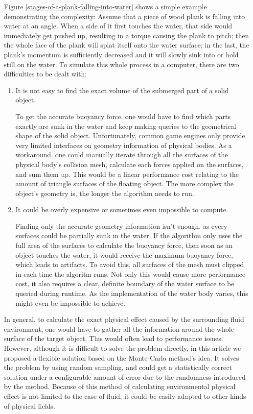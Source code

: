 Figure \ref{stages-of-a-plank-falling-into-water} shows a simple example demonstrating the complexity:
Assume that a piece of wood plank is falling into water at an angle.
When a side of it first touches the water, that side would immediately get pushed up, resulting in a torque causing the plank to pitch;
then the whole face of the plank will splat itself onto the water surface;
in the last, the plank's momentum is sufficiently decreased and it will slowly sink into or hold still on the water.
To simulate this whole process in a computer, there are two difficulties to be dealt with:

\begin{enumerate}
	\item It is not easy to find the exact volume of the submerged part of a solid object.

		To get the accurate buoyancy force, one would have to find which parts exactly are sunk in the water and keep making queries to the geometrical shape of the solid object.
		Unfortunately, common game engines only provide very limited interfaces on geometry information of physical bodies.
		As a workaround, one could manually iterate through all the surfaces of the physical body's collision mesh, calculate each forces applied on the surfaces, and sum them up.
		This would be a linear performance cost relating to the amount of triangle surfaces of the floating object.
		The more complex the object's geometry is, the longer the algorithm needs to run.

	\item It could be overly expensive or sometimes even impossible to compute.

		Finding only the accurate geometry information isn't enough, as every surfaces could be partially sunk in the water.
		If the algorithm only uses the full area of the surfaces to calculate the buoyancy force, then soon as an object touches the water, it would receive the maximum buoyancy force, which leads to artifacts.
		To avoid this, all surfaces of the mesh must clipped in each time the algoritm runs.
		Not only this would cause more performance cost, it also requires a clear, definite boundary of the water surface to be queried during runtime.
		As the implementation of the water body varies, this might even be impossible to achieve.
\end{enumerate}

In general, to calculate the exact physical effect caused by the surrounding fluid environment, one would have to gather all the information around the whole surface of the target object.
This would often lead to performance issues.
However, although it is difficult to solve the problem directly, in this article we proposed a flexible solution based on the Monte-Carlo method's idea.
It solves the problem by using random sampling, and could get a statistically correct solution under a configurable amount of error due to the randomness introduced by the method.
Because of this method of calculating environmental physical effect is not limited to the case of fluid, it could be easily adapted to other kinds of physical fields.